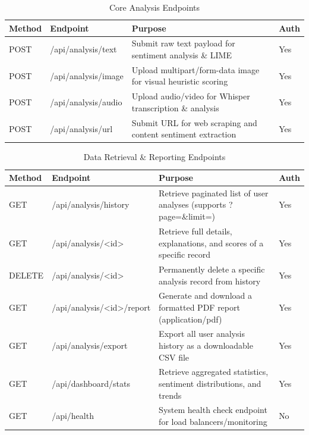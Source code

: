 \documentclass[12pt, a4paper]{report}
\begin{document}
\begin{table}[H]
\centering
\caption{Core Analysis Endpoints}
\label{tab:api-analysis}
\small
\begin{tabularx}{\textwidth}{|l|l|X|l|}
\hline
\textbf{Method} & \textbf{Endpoint} & \textbf{Purpose} & \textbf{Auth} \\
\hline
POST & /api/analysis/text & Submit raw text payload for sentiment analysis \& LIME & Yes \\
\hline
POST & /api/analysis/image & Upload multipart/form-data image for visual heuristic scoring & Yes \\
\hline
POST & /api/analysis/audio & Upload audio/video for Whisper transcription \& analysis & Yes \\
\hline
POST & /api/analysis/url & Submit URL for web scraping and content sentiment extraction & Yes \\
\hline
\end{tabularx}
\end{table}

\begin{table}[H]
\centering
\caption{Data Retrieval \& Reporting Endpoints}
\label{tab:api-data}
\small
\begin{tabularx}{\textwidth}{|l|l|X|l|}
\hline
\textbf{Method} & \textbf{Endpoint} & \textbf{Purpose} & \textbf{Auth} \\
\hline
GET  & /api/analysis/history & Retrieve paginated list of user analyses (supports ?page=\&limit=) & Yes \\
\hline
GET  & /api/analysis/<id> & Retrieve full details, explanations, and scores of a specific record & Yes \\
\hline
DELETE & /api/analysis/<id> & Permanently delete a specific analysis record from history & Yes \\
\hline
GET  & /api/analysis/<id>/report & Generate and download a formatted PDF report (application/pdf) & Yes \\
\hline
GET  & /api/analysis/export & Export all user analysis history as a downloadable CSV file & Yes \\
\hline
GET  & /api/dashboard/stats & Retrieve aggregated statistics, sentiment distributions, and trends & Yes \\
\hline
GET  & /api/health & System health check endpoint for load balancers/monitoring & No \\
\hline
\end{tabularx}
\end{table}
\end{document}
